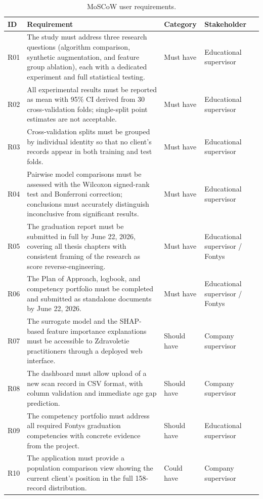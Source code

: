 \documentclass[11pt,a4paper]{article}
\begin{document}
\begin{table}[H]
  \centering
  \caption{MoSCoW user requirements.}
  \label{tab:moscow}
  \small
  \begin{tabular}{p{0.5cm} p{7.5cm} p{2.2cm} p{3cm}}
    \toprule
    \textbf{ID} & \textbf{Requirement} & \textbf{Category} & \textbf{Stakeholder} \\
    \midrule
    R01 & The study must address three research questions (algorithm comparison, synthetic augmentation, and feature group ablation), each with a dedicated experiment and full statistical testing. & Must have & Educational supervisor \\
    R02 & All experimental results must be reported as mean with 95\% CI derived from 30 cross-validation folds; single-split point estimates are not acceptable. & Must have & Educational supervisor \\
    R03 & Cross-validation splits must be grouped by individual identity so that no client's records appear in both training and test folds. & Must have & Educational supervisor \\
    R04 & Pairwise model comparisons must be assessed with the Wilcoxon signed-rank test and Bonferroni correction; conclusions must accurately distinguish inconclusive from significant results. & Must have & Educational supervisor \\
    R05 & The graduation report must be submitted in full by June 22, 2026, covering all thesis chapters with consistent framing of the research as score reverse-engineering. & Must have & Educational supervisor / Fontys \\
    R06 & The Plan of Approach, logbook, and competency portfolio must be completed and submitted as standalone documents by June 22, 2026. & Must have & Educational supervisor / Fontys \\
    R07 & The surrogate model and the SHAP-based feature importance explanations must be accessible to Zdravoletie practitioners through a deployed web interface. & Should have & Company supervisor \\
    R08 & The dashboard must allow upload of a new scan record in CSV format, with column validation and immediate age gap prediction. & Should have & Company supervisor \\
    R09 & The competency portfolio must address all required Fontys graduation competencies with concrete evidence from the project. & Should have & Educational supervisor \\
    R10 & The application must provide a population comparison view showing the current client's position in the full 158-record distribution. & Could have & Company supervisor \\

\end{tabular}
\end{table}
\end{document}
